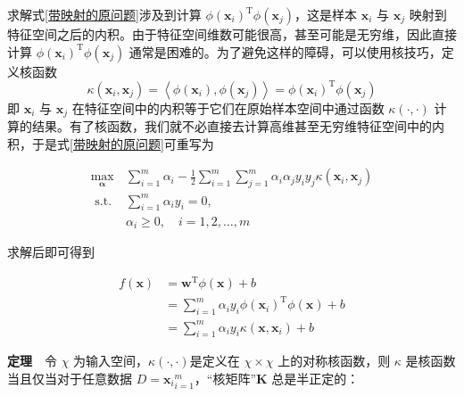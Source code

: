 \documentclass{ctexart}
\begin{document}
	求解式\eqref{带映射的原问题}涉及到计算 $\phi\left(\boldsymbol{x}_{i}\right)^{\mathrm{T}} \phi\left(\boldsymbol{x}_{j}\right)$，这是样本 $\boldsymbol{x}_i$ 与 $\boldsymbol{x}_j$ 映射到特征空间之后的内积。由于特征空间维数可能很高，甚至可能是无穷维，因此直接计算 $\phi\left(\boldsymbol{x}_{i}\right)^{\mathrm{T}} \phi\left(\boldsymbol{x}_{j}\right)$ 通常是困难的。为了避免这样的障碍，可以使用核技巧，定义核函数
	\begin{equation}
		\kappa\left(\boldsymbol{x}_{i}, \boldsymbol{x}_{j}\right)=\left\langle\phi\left(\boldsymbol{x}_{i}\right), \phi\left(\boldsymbol{x}_{j}\right)\right\rangle=\phi\left(\boldsymbol{x}_{i}\right)^{\mathrm{T}} \phi\left(\boldsymbol{x}_{j}\right)
	\end{equation}
	即 $\boldsymbol{x}_i$ 与 $\boldsymbol{x}_j$ 在特征空间中的内积等于它们在原始样本空间中通过函数 $\kappa(\cdot,\cdot)$ 计算的结果。有了核函数，我们就不必直接去计算高维甚至无穷维特征空间中的内积，于是式\eqref{带映射的原问题}可重写为
	
	\begin{equation}
		\begin{aligned}
			\max _{\boldsymbol{\alpha}} & \sum_{i=1}^{m} \alpha_{i}-\frac{1}{2} \sum_{i=1}^{m} \sum_{j=1}^{m} \alpha_{i} \alpha_{j} y_{i} y_{j} \kappa\left(\boldsymbol{x}_{i}, \boldsymbol{x}_{j}\right) \\
			\text { s.t. } & \sum_{i=1}^{m} \alpha_{i} y_{i}=0, \\
			& \alpha_{i} \geqslant 0, \quad i=1,2, \ldots, m
		\end{aligned}
	\end{equation}
	
	求解后即可得到
	
	\begin{equation}
		\begin{aligned}
			f(\boldsymbol{x}) &=\boldsymbol{w}^{\mathrm{T}} \phi(\boldsymbol{x})+b \\
			&=\sum_{i=1}^{m} \alpha_{i} y_{i} \phi\left(\boldsymbol{x}_{i}\right)^{\mathrm{T}} \phi(\boldsymbol{x})+b \\
			&=\sum_{i=1}^{m} \alpha_{i} y_{i} \kappa\left(\boldsymbol{x}, \boldsymbol{x}_{i}\right)+b
		\end{aligned}
		\label{fx}
	\end{equation}

	\textbf{定理}\ \ 令 $\chi$ 为输入空间，$\kappa(\cdot,\cdot)$是定义在 $\chi\times\chi$ 上的对称核函数，则 $\kappa$ 是核函数当且仅当对于任意数据 $D={\boldsymbol{x}_i}_{i=1}^m$，“核矩阵”$\mathbf{K}$ 总是半正定的：
	
\end{document}
